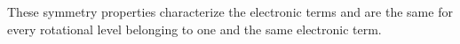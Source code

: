 These symmetry properties characterize the electronic terms and are the same for every rotational level belonging to one and the same electronic term.
